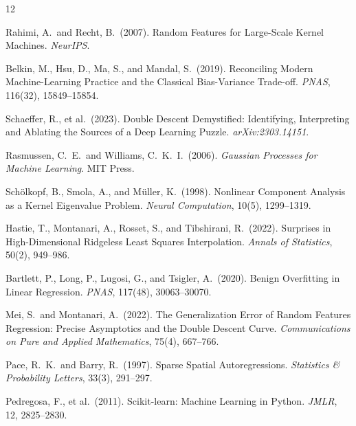 \documentclass{article}
\begin{document}
\begin{thebibliography}{12}

Rahimi, A.\ and Recht, B.\ (2007).
Random Features for Large-Scale Kernel Machines.
\textit{NeurIPS}.

Belkin, M., Hsu, D., Ma, S., and Mandal, S.\ (2019).
Reconciling Modern Machine-Learning Practice and the Classical Bias-Variance Trade-off.
\textit{PNAS}, 116(32), 15849--15854.

Schaeffer, R., et al.\ (2023).
Double Descent Demystified: Identifying, Interpreting and Ablating the Sources of a Deep Learning Puzzle.
\textit{arXiv:2303.14151}.

Rasmussen, C.\ E.\ and Williams, C.\ K.\ I.\ (2006).
\textit{Gaussian Processes for Machine Learning}.
MIT Press.

Sch\"olkopf, B., Smola, A., and M\"uller, K.\ (1998).
Nonlinear Component Analysis as a Kernel Eigenvalue Problem.
\textit{Neural Computation}, 10(5), 1299--1319.

Hastie, T., Montanari, A., Rosset, S., and Tibshirani, R.\ (2022).
Surprises in High-Dimensional Ridgeless Least Squares Interpolation.
\textit{Annals of Statistics}, 50(2), 949--986.

Bartlett, P., Long, P., Lugosi, G., and Tsigler, A.\ (2020).
Benign Overfitting in Linear Regression.
\textit{PNAS}, 117(48), 30063--30070.

Mei, S.\ and Montanari, A.\ (2022).
The Generalization Error of Random Features Regression: Precise Asymptotics and the Double Descent Curve.
\textit{Communications on Pure and Applied Mathematics}, 75(4), 667--766.

Pace, R.\ K.\ and Barry, R.\ (1997).
Sparse Spatial Autoregressions.
\textit{Statistics \& Probability Letters}, 33(3), 291--297.

Pedregosa, F., et al.\ (2011).
Scikit-learn: Machine Learning in Python.
\textit{JMLR}, 12, 2825--2830.

\end{thebibliography}
\end{document}
